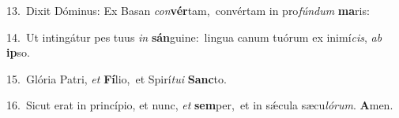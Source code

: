 {\numbfont\textcolor{\numbcolor}{13.}}~Dixit Dóminus: Ex Basan \textit{con}\-\textbf{vér}tam,~\star convértam in pro\-\textit{fún}\-\textit{dum} \textbf{ma}\-ris:\par
{\numbfont\textcolor{\numbcolor}{14.}}~Ut intingátur pes tuus \textit{in} \textbf{sán}\-guine:~\star lingua canum tuórum ex inimí\-\textit{cis}\-, \textit{ab} \textbf{ip}\-so.\par
{\numbfont\textcolor{\numbcolor}{15.}}~Glória Patri, \textit{et} \textbf{Fí}\-lio,~\star et Spirí\-\textit{tu}\-\textit{i} \textbf{Sanc}\-to.\par
{\numbfont\textcolor{\numbcolor}{16.}}~Sicut erat in princípio, et nunc, \textit{et} \textbf{sem}\-per,~\star et in sǽcula sæcu\-\textit{ló}\-\textit{rum}. \textbf{A}\-men.\par
